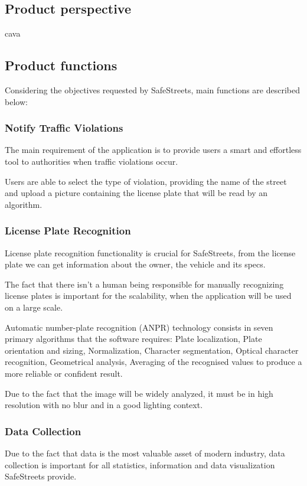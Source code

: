 \subsection{Product perspective}

cava

\subsection{Product functions}
Considering the objectives requested by SafeStreets, main functions are described below:

\subsubsection{Notify Traffic Violations}
The main requirement of the application is to provide users a smart and effortless tool to authorities when traffic violations occur.

Users are able to select the type of violation, providing the name of the street and upload a picture containing the license plate that will be read by an algorithm.

\subsubsection{License Plate Recognition}
License plate recognition functionality is crucial for SafeStreets, from the license plate we can get information about the owner, the vehicle and its specs.

The fact that there isn't a human being responsible for manually recognizing license plates is important for the scalability, when the application will be used on a large scale.

Automatic number-plate recognition (ANPR) technology consists in seven primary algorithms that the software requires: Plate localization, Plate orientation and sizing, Normalization, Character segmentation, Optical character recognition, Geometrical analysis, Averaging of the recognised values to produce a more reliable or confident result.

Due to the fact that the image will be widely analyzed, it must be in high resolution with no blur and in a good lighting context.

\subsubsection{Data Collection}
Due to the fact that data is the most valuable asset of modern industry, data collection is important for all statistics, information and data visualization SafeStreets provide.

